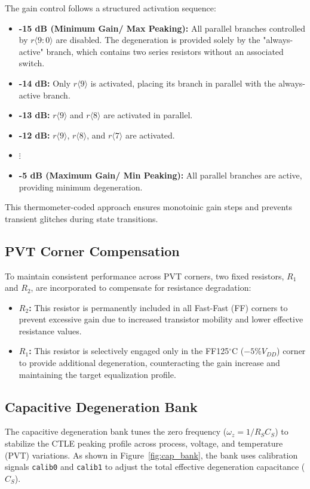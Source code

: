 The gain control follows a structured activation sequence:
\begin{itemize}
    \item \textbf{-15 dB (Minimum Gain/ Max Peaking):} All parallel branches controlled by $r\langle9:0\rangle$ are disabled. The degeneration is provided solely by the "always-active" branch, which contains two series resistors without an associated switch.
    \item \textbf{-14 dB:} Only $r\langle9\rangle$ is activated, placing its branch in parallel with the always-active branch.
    \item \textbf{-13 dB:} $r\langle9\rangle$ and $r\langle8\rangle$ are activated in parallel.
    \item \textbf{-12 dB:} $r\langle9\rangle$, $r\langle8\rangle$, and $r\langle7\rangle$ are activated.
    \item[] \centering $\vdots$
    \item \textbf{-5 dB (Maximum Gain/ Min Peaking):} All parallel branches are active, providing minimum degeneration.
\end{itemize}
This thermometer-coded approach ensures monotoinic gain steps and prevents transient glitches during state transitions.

\subsection*{PVT Corner Compensation}
To maintain consistent performance across PVT corners, two fixed resistors, $R_1$ and $R_2$, are incorporated to compensate for resistance degradation:
\begin{itemize}
    \item \textbf{$R_2$:} This resistor is permanently included in all Fast-Fast (FF) corners to prevent excessive gain due to increased transistor mobility and lower effective resistance values.
    \item \textbf{$R_1$:} This resistor is selectively engaged only in the FF125$^{\circ}$C ($-5\% V_{DD}$) corner to provide additional degeneration, counteracting the gain increase and maintaining the target equalization profile.
\end{itemize}


\newpage
\subsection{Capacitive Degeneration Bank}
\label{sec:capbank}

The capacitive degeneration bank tunes the zero frequency ($\omega_z = 1/R_S C_S$) to stabilize the CTLE peaking profile across process, voltage, and temperature (PVT) variations. As shown in Figure~\ref{fig:cap_bank}, the bank uses calibration signals \texttt{calib0} and \texttt{calib1} to adjust the total effective degeneration capacitance ($C_S$).

